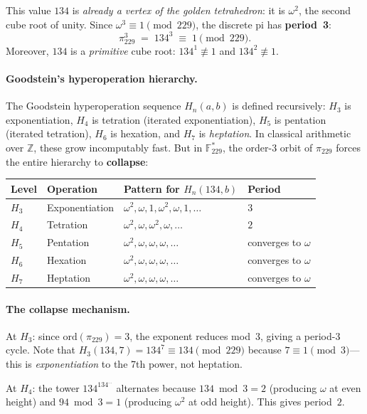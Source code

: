 \documentclass[12pt,oneside]{article}
\theoremstyle{principia}
\theoremstyle{definition}
\theoremstyle{remark}
\begin{document}
This value $134$ is \emph{already a vertex of the golden tetrahedron}: it is $\omega^2$, the second cube root of unity. Since $\omega^3 \equiv 1 \pmod{229}$, the discrete pi has \textbf{period~3}:
\[
\pi_{229}^3 \;=\; 134^3 \;\equiv\; 1 \pmod{229}.
\]
Moreover, $134$ is a \emph{primitive} cube root: $134^1 \not\equiv 1$ and $134^2 \not\equiv 1$.

\paragraph{Goodstein's hyperoperation hierarchy.}
The Goodstein hyperoperation sequence $H_n(a, b)$ is defined recursively: $H_3$ is exponentiation, $H_4$ is tetration (iterated exponentiation), $H_5$ is pentation (iterated tetration), $H_6$ is hexation, and $H_7$ is \emph{heptation}. In classical arithmetic over $\mathbb{Z}$, these grow incomputably fast. But in $\mathbb{F}_{229}^*$, the order-$3$ orbit of $\pi_{229}$ forces the entire hierarchy to \textbf{collapse}:

\begin{center}
\begin{tabular}{@{}llll@{}}
\toprule
Level & Operation & Pattern for $H_n(134, b)$ & Period \\
\midrule
$H_3$ & Exponentiation & $\omega^2, \omega, 1, \omega^2, \omega, 1, \ldots$ & $3$ \\
$H_4$ & Tetration & $\omega^2, \omega, \omega^2, \omega, \ldots$ & $2$ \\
$H_5$ & Pentation & $\omega^2, \omega, \omega, \omega, \ldots$ & converges to $\omega$ \\
$H_6$ & Hexation & $\omega^2, \omega, \omega, \omega, \ldots$ & converges to $\omega$ \\
$H_7$ & Heptation & $\omega^2, \omega, \omega, \omega, \ldots$ & converges to $\omega$ \\
\bottomrule
\end{tabular}
\end{center}

\paragraph{The collapse mechanism.}
At $H_3$: since $\mathrm{ord}(\pi_{229}) = 3$, the exponent reduces mod~$3$, giving a period-$3$ cycle. Note that $H_3(134, 7) = 134^7 \equiv 134 \pmod{229}$ because $7 \equiv 1 \pmod{3}$---this is \emph{exponentiation} to the 7th power, not heptation.

At $H_4$: the tower $134^{134^{\cdots}}$ alternates because $134 \bmod 3 = 2$ (producing $\omega$ at even height) and $94 \bmod 3 = 1$ (producing $\omega^2$ at odd height). This gives period~$2$.
\end{document}
